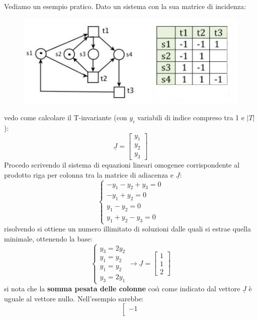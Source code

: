 \documentclass[a4paper,12pt, oneside]{book}
\begin{document}
\begin{esempio}
  Vediamo un esempio pratico. Dato un sistema con la sua matrice di incidenza:
  \begin{figure}[H]
    \centering
    \includegraphics[scale = 2.2]{img/ti2.jpg}
  \end{figure}
  vedo come calcolare il T-invariante (con $y_i$ variabili di indice compreso
  tra 1 e $|T|$):
  \[\underline{J}=\left[
      \begin{matrix}
        y_1\\
        y_2\\
        y_3
      \end{matrix}
    \right]\]
  Procedo scrivendo il sistema di equazioni lineari omogenee corrispondente al
  prodotto riga per colonna tra la matrice di adiacenza e $\underline{J}$:
  \[
    \begin{cases}
      -y_1-y_2+y_3=0\\
      -y_1+y_2=0\\
      y_1-y_2=0\\
      y_1+y_2-y_3=0
    \end{cases}
  \]
  risolvendo si ottiene un numero illimitato di soluzioni dalle quali si
  estrae quella minimale, ottenendo la base:
  \[
    \begin{cases}
      y_3=2y_2\\
      y_1=y_2\\
      y_1=y_2\\
      y_3=2y_1
    \end{cases}\to\underline{J}=\left[
      \begin{matrix}
        1\\
        1\\
        2
      \end{matrix}
    \right]
  \]
  si nota che la \textbf{somma pesata delle colonne} cosı̀ come indicato dal
  vettore $\underline{J}$ è uguale al vettore nullo. Nell'esempio sarebbe:
  \[
    \left[
      \begin{matrix}
        -1\\

\end{matrix}\]
\end{esempio}
\end{document}
